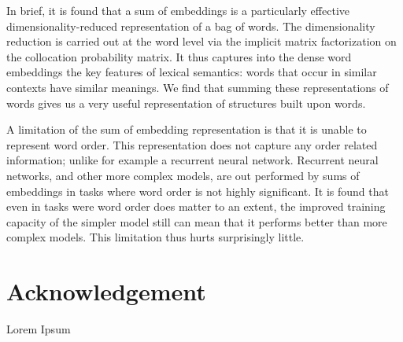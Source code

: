 \documentclass{book}
\begin{document}
In brief, it is found that a sum of embeddings is a particularly effective dimensionality-reduced representation of a bag of words.
The dimensionality reduction is carried out at the word level via the implicit matrix factorization 
on the collocation probability matrix.
It thus captures into the dense word embeddings the key features of lexical semantics:
words that occur in similar contexts have similar meanings.
We find that summing these representations of words gives us a very useful representation of structures built upon words.

A limitation of the sum of embedding representation is that it is unable to represent word order.
This representation does not capture any order related information; unlike for example a recurrent neural network.
Recurrent neural networks, and other more complex models, are out performed by sums of embeddings in tasks where word order is not highly significant.
It is found that even in tasks were word order does matter to an extent, the improved training capacity of the simpler model still can mean that it performs better than more complex models.
This limitation thus hurts surprisingly little.

\section*{Acknowledgement}
Lorem Ipsum 
\end{document}
